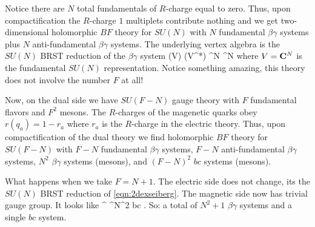 \documentclass[11pt]{amsart}
\begin{document}
Notice there are $N$ total fundamentals of $R$-charge equal to zero. 
Thus, upon compactification the $R$-charge $1$ multiplets contribute nothing and we get two-dimensional holomorphic $BF$ theory for $SU(N)$ with $N$ fundamental $\beta\gamma$ systems plus $N$ anti-fundamental $\beta\gamma$ systems.
The underlying vertex algebra is the $SU(N)$ BRST reduction of the $\beta\gamma$ system
\beqn\label{eqn:2dexseiberg}
\beta\gamma(V) \otimes \beta\gamma(V^*) \cong \beta\gamma^{\otimes N} \otimes \beta\gamma^{\otimes N}
\eeqn
where $V = \mathbf{C}^N$ is the fundamental $SU(N)$ representation.
Notice something amazing, this theory does not involve the number $F$ at all!

Now, on the dual side we have $SU(F-N)$ gauge theory with $F$ fundamental flavors and $F^2$ mesons.
The $R$-charges of the magenetic quarks obey $r(q_a) = 1-r_a$ where $r_a$ is the $R$-charge in the electric theory.
Thus, upon compactification of the dual theory we find holomorphic $BF$ theory for $SU(F-N)$ with $F-N$ fundamental $\beta\gamma$ systems, $F-N$ anti-fundamental $\beta\gamma$ systems, $N^2$ $\beta\gamma$ systems (mesons), and $(F-N)^2$ $bc$ systems (mesons).

What happens when we take $F = N+1$.
The electric side does not change, its the $SU(N)$ BRST reduction of \eqref{eqn:2dexseiberg}.
The magnetic side now has trivial gauge group.
It looks like
\beqn
\beta\gamma^{} \otimes \beta\gamma^{\otimes N^2} \otimes bc .
\eeqn
So: a total of $N^2 + 1$ $\beta\gamma$ systems and a single $bc$ system.
\end{document}
